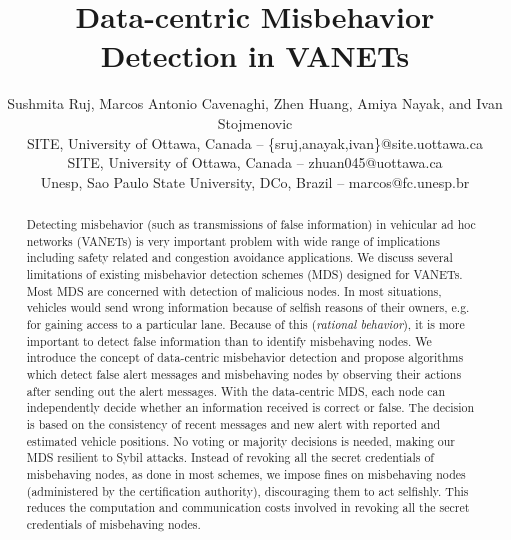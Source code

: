 \documentclass[conference]{IEEEtran}[10pt]
\begin{document}
\title{Data-centric Misbehavior Detection in VANETs}
\author{Sushmita Ruj, Marcos Antonio Cavenaghi, Zhen Huang, Amiya Nayak, and Ivan Stojmenovic\\ 
SITE, University of Ottawa, Canada -- \{sruj,anayak,ivan\}@site.uottawa.ca\\
SITE, University of Ottawa, Canada -- zhuan045@uottawa.ca\\
Unesp, Sao Paulo State University, DCo, Brazil -- marcos@fc.unesp.br}
\maketitle

\newcommand{\ot}{\otimes}
\newcommand{\m}{\mu}
\renewcommand{\l}{\lambda}
\newtheorem{definition}{Definition}
\newtheorem{construction}{Construction}
\newtheorem{theorem}{Theorem}
\newtheorem{question}{Question}
\newtheorem{lemma}{Lemma}
\newtheorem{proposition}{Proposition}
\newtheorem{remark}{Remark}
\newtheorem{corollary}{Corollary}
\newtheorem{example}{Example}

\begin{abstract}
Detecting misbehavior (such as transmissions of false information) in vehicular ad hoc networks (VANETs) is very important problem with wide range of implications including safety related and congestion avoidance applications.
We discuss several limitations of existing misbehavior detection schemes (MDS) designed for VANETs.
Most MDS are concerned with detection of malicious nodes. 
In most situations, vehicles would send wrong information because of selfish reasons of their owners, e.g. for
gaining access to a particular lane.
Because of this (\emph{rational behavior}), it is more important to detect false information than to identify misbehaving nodes. 
We introduce the concept of data-centric misbehavior detection and 
propose algorithms which detect false alert messages and
misbehaving nodes by observing their actions after sending out the alert messages.
With the data-centric MDS, each node can independently decide whether an  information received is correct or false. The decision is based on the consistency of recent messages and new alert with reported and estimated vehicle positions.
No voting or majority decisions is needed, making our MDS resilient to Sybil attacks.
Instead of revoking all the secret credentials of misbehaving nodes, as done in most schemes,
we impose fines on misbehaving nodes (administered by the certification authority), discouraging them to act selfishly.
This reduces the computation and communication costs involved in revoking all the secret credentials of misbehaving nodes.

\end{abstract}
\end{document}

